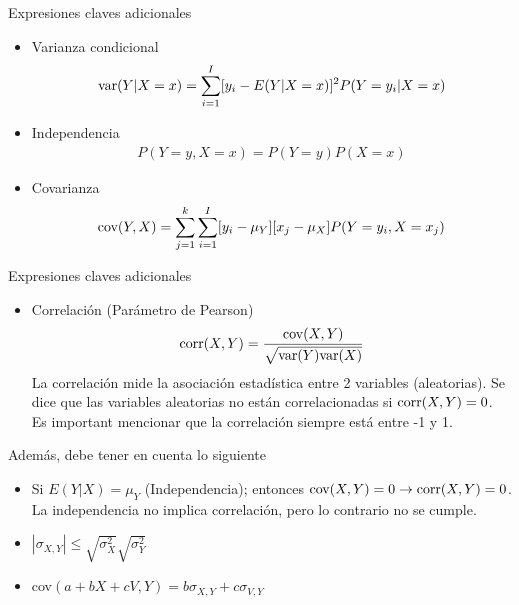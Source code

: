 \begin{frame}{Expresiones claves adicionales}
	\begin{itemize}
		\item Varianza condicional
			\begin{align*}
				\textup{var}(Y|X=x) = \sum_{i=1}^{I}[y_{i}-E(Y|X=x)]^2P(Y=y_{i}|X=x)
			\end{align*}
		\item Independencia
			\begin{align*}
				P(Y=y,X=x)=P(Y=y)P(X=x)
			\end{align*}
		\item Covarianza
			\begin{align*}
				\textup{cov}(Y,X)=\sum_{j=1}^{k}\sum_{i=1}^{I}[y_i-\mu_{Y}][x_j-\mu_{X}]P(Y=y_i,X=x_j)
			\end{align*}
	\end{itemize}
\end{frame}
\begin{frame}{Expresiones claves adicionales}
	\begin{itemize}
		\item Correlación (Parámetro de Pearson)
		$$\textup{corr}(X,Y)=\frac{\textup{cov}(X,Y)}{\sqrt{\textup{var}(Y)\textup{var}(X)}}$$
		La correlación mide la asociación estadística entre 2 variables (aleatorias). Se dice que las variables aleatorias no están correlacionadas si $\textup{corr}(X,Y)=0$. Es important mencionar que la correlación siempre está entre -1 y 1.
	\end{itemize} Además, debe tener en cuenta lo siguiente
	\begin{itemize}
		\item Si $E(Y|X) = \mu_{Y}$ (Independencia); entonces $\textup{cov}(X,Y)=0 \rightarrow \textup{corr}(X,Y) = 0$. La independencia no implica correlación, pero lo contrario no se cumple.
		\item $|\sigma_{X,Y}| \leq \sqrt{\sigma_{X}^{2}}\sqrt{\sigma_{Y}^{2}}$
		\item cov$(a+bX+cV,Y) = b\sigma_{X,Y} + c\sigma_{V,Y}$
	\end{itemize}
\end{frame}
